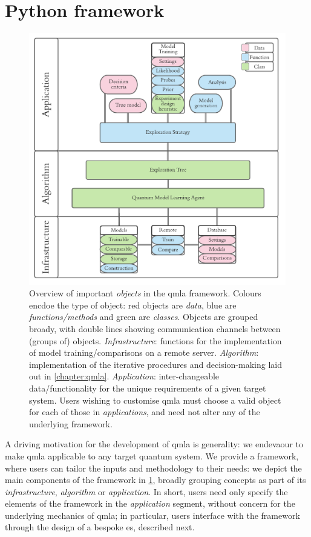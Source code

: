 \section{Python framework}
\begin{figure}
    \includegraphics{algorithms/software_overview.pdf}
    \caption[\gls{QMLA} codebase overview]{
        Overview of important \emph{objects} in the \gls{qmla} framework.
        Colours encdoe the type of object: red objects are \emph{data}, blue are \emph{functions/methods} 
        and green are \emph{classes}. 
        Objects are grouped broady, with double lines showing communication channels between (groups of) objects. 
        \emph{Infrastructure}: functions for the implementation of model training/comparisons on 
        a remote server.
        \emph{Algorithm}: implementation of the iterative procedures and decision-making 
        laid out in \cref{chapter:qmla}. 
        \emph{Application}: inter-changeable data/functionality for the unique requirements 
        of a given target system. 
        Users wishing to customise \gls{qmla} must choose a valid object for each of those in \emph{applications}, 
            and need not alter any of the underlying framework.
    }
    \label{fig:software_overview}
\end{figure}

A driving motivation for the development of \gls{qmla} is generality:
    we endevaour to make \gls{qmla} applicable to any target quantum system.
We provide a framework, where users can tailor the inputs and methodology to their needs:
    we depict the main components of the framework in \cref{fig:software_overview}, 
    broadly grouping concepts as part of its \emph{infrastructure}, \emph{algorithm}
    or \emph{application}. 
In short, users need only specify the elements of the framework in the \emph{application} segment, 
    without concern for the underlying mechanics of \gls{qmla}; 
    in particular, users interface with the framework through the design of a bespoke \gls{es}, described next. 


